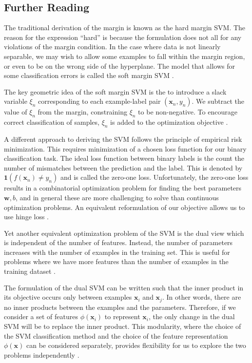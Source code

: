 \documentclass[../../../main.tex]{subfiles}
\begin{document}
\subsection{Further Reading}

The traditional derivation of the margin is known as the hard margin SVM. The reason for the expression ``hard'' is because the formulation does not all for any violations of the margin condition. In the case where data is not linearly separable, we may wish to allow some examples to fall within the margin region, or even to be on the wrong side of the hyperplane. The model that allows for some classification errors is called the soft margin SVM \autocite{Deisenroth2020}.

The key geometric idea of the soft margin SVM is the to introduce a slack variable $\xi_n$ corresponding to each example-label pair $(\bm{x}_n,y_n)$. We subtract the value of $\xi_n$ from the margin, constraining $\xi_n$ to be non-negative. To encourage correct classification of samples, $\xi_n$ is added to the optimization objective \autocite{Deisenroth2020}.

A different approach to deriving the SVM follows the principle of empirical risk minimization. This requires minimization of a chosen loss function for our binary classification task. The ideal loss function between binary labels is the count the number of mismatches between the prediction and the label. This is denoted by $\mathbf{1}(f(\bm{x}_n) \neq y_n)$ and is called the zero-one loss. Unfortunately, the zero-one loss results in a combinatorial optimization problem for finding the best parameters $\bm{w},b$, and in general these are more challenging to solve than continuous optimization problems. An equivalent reformulation of our objective allows us to use hinge loss \autocite{Deisenroth2020}.

Yet another equivalent optimization problem of the SVM is the dual view which is independent of the number of features. Instead, the number of parameters increases with the number of examples in the training set. This is useful for problems where we have more features than the number of examples in the training dataset \autocite{Deisenroth2020}.

The formulation of the dual SVM can be written such that the inner product in its objective occurs only between examples $\bm{x}_i$ and $\bm{x}_j$. In other words, there are no inner products between the examples and the parameters. Therefore, if we consider a set of features $\phi(\bm{x}_i)$ to represent $\bm{x}_i$, the only change in the dual SVM will be to replace the inner product. This modularity, where the choice of the SVM classification method and the choice of the feature representation $\phi(\bm{x})$ can be considered separately, provides flexibility for us to explore the two problems independently \autocite{Deisenroth2020}.
\end{document}
